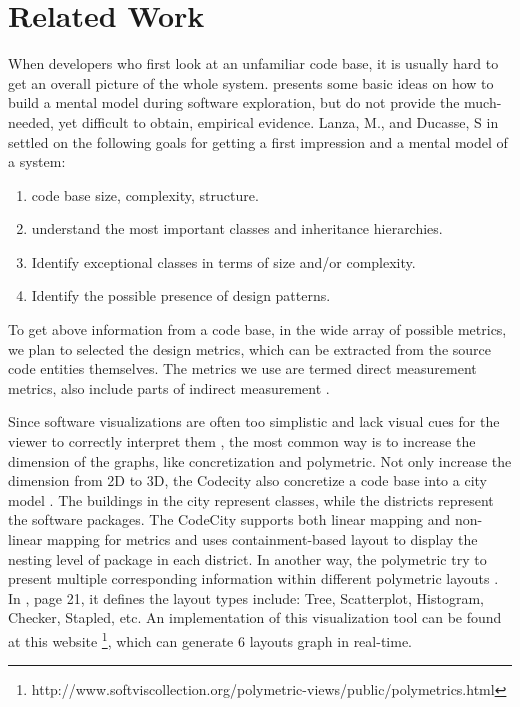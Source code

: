 \documentclass{sig-alternate}
\begin{document}
\section{Related Work}
When developers who first look at an unfamiliar code base,
it is usually hard to get an overall picture of the whole system.
\cite{stasko1998software} presents some basic ideas on how to build a mental model during software exploration,
but do not provide the much-needed, yet difficult to obtain, empirical evidence.
Lanza, M., and Ducasse, S in \cite{lanza2003polymetric} settled on the following goals for getting a first impression and a mental model of a system:

\begin{enumerate}
\item code base size, complexity, structure.
\item understand the most important classes and inheritance hierarchies.
\item Identify exceptional classes in terms of size and/or complexity.
\item Identify the possible presence of design patterns.
\end{enumerate}

To get above information from a code base, in the wide array of possible metrics,
we plan to selected the design metrics, which can be extracted from the source code entities themselves.
The metrics we use are termed direct measurement metrics, also include parts of indirect measurement \cite{storey1999cognitive}.

Since software visualizations are often too simplistic and lack visual cues for the viewer to correctly interpret them \cite{petre1995looking},
the most common way is to increase the dimension of the graphs, like concretization and polymetric.
Not only increase the dimension from 2D to 3D, the Codecity also concretize a code base into a city model \cite{wettel2008codecity}.
The buildings in the city represent classes, while the districts represent the software packages.
The CodeCity supports both linear mapping and non-linear mapping for metrics and uses containment-based layout to
display the nesting level of package in each district. In another way, the polymetric try
to present multiple corresponding information within different polymetric layouts \cite{lanza2003polymetric, lanza2005codecrawler, lanza2003object}.
In \cite{lanza2003object}, page 21, it defines the layout types include: Tree, Scatterplot, Histogram, Checker, Stapled, etc.
An implementation of this visualization tool can be found at this website \footnote{http://www.softviscollection.org/polymetric-views/public/polymetrics.html},
which can generate 6 layouts graph in real-time. 
\end{document}

